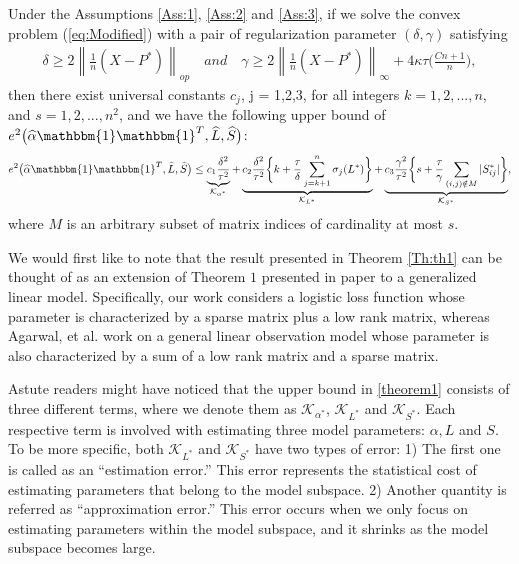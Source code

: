 \documentclass[AMS,STIX1COL]{WileyNJD-v2}
\begin{document}
{\begin{theorem} \label{Th:th1}
Under the Assumptions \ref{Ass:1}, \ref{Ass:2} and \ref{Ass:3},
if we solve the convex problem (\ref{eq:Modified}) with a pair of regularization parameter $(\delta,\gamma)$ satisfying
\begin{align} \label{eq:49}
\delta \geq 2 \left\|\frac{1}{n}(X-P^{*}) \right\|_{op} \quad and \quad \gamma \geq 2\left\|\frac{1}{n}(X-P^{*})\right\|_{\infty}+4\kappa\tau\bigg(\frac{Cn+1}{n} \bigg),
\end{align}
then there exist universal constants $c_{j}$, j = 1,2,3,  for all integers $k = 1,2,...,n$, and $s = 1,2,...,n^{2}$, and we have the following upper bound of $e^{2}\big(\widehat{\alpha}\mathbbm{1}\mathbbm{1}^T,\widehat{L},\widehat{S}\big)$:
\begin{align} \label{theorem1}
    e^{2}\big(\widehat{\alpha}\mathbbm{1}\mathbbm{1}^T,\widehat{L},\widehat{S}\big) \leq
    \underbrace{c_{1}\frac{\delta^{2}}{\tau^{2}}}
    _{\mathcal{K}_{\alpha^*}} +
    \underbrace{c_{2}\frac{\delta^{2}}{\tau^{2}}
    \bigg\{k + \frac{\tau}{\delta}\sum_{j=k+1}^{n}\sigma_{j}(L^{*})\bigg\}}_{\mathcal{K}_{L^*}} +
    \underbrace{c_{3}\frac{\gamma^{2}}{\tau^{2}}
    \bigg\{s + \frac{\tau}{\gamma}\sum_{(i,j) \notin M}|S^*_{ij}|\bigg\}}_{\mathcal{K}_{S^*}},
\end{align}
where $M$ is an arbitrary subset of matrix indices of cardinality at most $s$.
\end{theorem}

We would first like to note that the result presented in Theorem \ref{Th:th1} can be thought of as an extension of Theorem $1$ presented in paper \cite{agarwal2012noisy} to a generalized linear model.
Specifically, our work considers a logistic loss function whose parameter is characterized by a sparse matrix plus a low rank matrix,
whereas Agarwal, et al. \cite{agarwal2012noisy} work on a general linear observation model whose parameter is also
characterized by a sum of a low rank matrix and a sparse matrix.


Astute readers might have noticed that the upper bound in \eqref{theorem1} consists of three different terms, where we denote them as
$\mathcal{K}_{\alpha^*}$, $\mathcal{K}_{L^*}$ and $\mathcal{K}_{S^*}$.
Each respective term is involved with estimating three model parameters: $\alpha, L$ and $S$.
To be more specific, both $\mathcal{K}_{L^*}$ and $\mathcal{K}_{S^*}$ have two types of error:
1) The first one is called as an ``estimation error.''
This error represents the statistical cost of estimating parameters that belong to the model subspace.
2) Another quantity is referred as ``approximation error.''
This error occurs when we only focus on estimating parameters within the model subspace,
and it shrinks as the model subspace becomes large.

}
\end{document}
